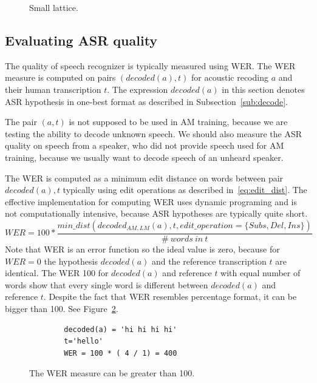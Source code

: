 {\begin{figure}[!htp]
    \begin{center}
    
    \caption{Small lattice. }
    \label{fig:toy_lat} 
    \end{center}
\end{figure}


\subsection{Evaluating \ac{ASR} quality}
\label{sub:eval}
The quality of speech recognizer is typically measured using \acl{WER}.
The \ac{WER} measure is computed on pairs $(decoded(a),t)$ for acoustic recoding $a$ and their human transcription $t$.
The expression $decoded(a)$  in this section denotes \ac{ASR} hypothesis in one-best format 
as described in Subsection~\ref{sub:decode}.

The pair $(a,t)$ is not supposed to be used in \ac{AM} training,
because we are testing the ability to decode unknown speech.
We should also measure the \ac{ASR} quality on speech from a speaker,
who did not provide speech used for \ac{AM} training, 
because we usually want to decode speech of an unheard speaker.

The \ac{WER} is computed as a minimum edit distance on words between 
pair $decoded(a), t$ typically using edit operations  as described in~\ref{eq:edit_dist}.
The effective implementation for computing WER uses dynamic programing and is not computationally intensive,
because \ac{ASR} hypotheses are typically quite short.
\begin{equation} \label{eq:edit_dist}
    WER = 100* \frac{min\_dist(decoded_{AM, LM}(a), t, edit\_operation=\{Subs, Del, Ins\})}{\#\ words\ in\ t}
\end{equation}
Note that \ac{WER} is an error function so the ideal value is zero, because for $WER=0$ the hypothesis $decoded(a)$ and 
the reference transcription $t$ are identical. The \ac{WER} 100 for $decoded(a)$ and reference $t$ 
with equal number of words show that every single word is different between $decoded(a)$ and reference $t$.
Despite the fact that \ac{WER} resembles percentage format, it can be bigger than 100. See Figure~\ref{fig:wer400}.
\begin{figure}[!htp]
    \begin{center}
    \begin{verbatim}
        decoded(a) = 'hi hi hi hi'
        t='hello'
        WER = 100 * ( 4 / 1) = 400
    \end{verbatim}
    \caption{The \acs{WER} measure can be greater than 100.}
    \label{fig:wer400} 
    \end{center}
\end{figure}

}
